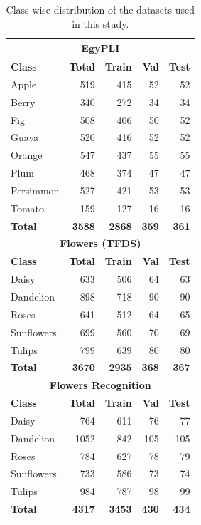 \begin{table}[t]
	\centering
	\caption{Class-wise distribution of the datasets used in this study.}
	\label{tab:classwise_dataset_distribution}
	\begin{tabular}{|l|r|r|r|r|}
		\hline
		\multicolumn{5}{|c|}{\textbf{EgyPLI}} \\
		\hline
		\textbf{Class} & \textbf{Total} & \textbf{Train} & \textbf{Val} & \textbf{Test} \\
		\hline
		Apple      & 519 & 415 & 52 & 52 \\
		Berry      & 340 & 272 & 34 & 34 \\
		Fig        & 508 & 406 & 50 & 52 \\
		Guava      & 520 & 416 & 52 & 52 \\
		Orange     & 547 & 437 & 55 & 55 \\
		Plum       & 468 & 374 & 47 & 47 \\
		Persimmon  & 527 & 421 & 53 & 53 \\
		Tomato     & 159 & 127 & 16 & 16 \\
		\hline
		\textbf{Total} & \textbf{3588} & \textbf{2868} & \textbf{359} & \textbf{361} \\
		\hline
		
		\multicolumn{5}{|c|}{\textbf{Flowers (TFDS)}} \\
		\hline
		\textbf{Class} & \textbf{Total} & \textbf{Train} & \textbf{Val} & \textbf{Test} \\
		\hline
		Daisy       & 633 & 506 & 64 & 63 \\
		Dandelion   & 898 & 718 & 90 & 90 \\
		Roses       & 641 & 512 & 64 & 65 \\
		Sunflowers  & 699 & 560 & 70 & 69 \\
		Tulips      & 799 & 639 & 80 & 80 \\
		\hline
		\textbf{Total} & \textbf{3670} & \textbf{2935} & \textbf{368} & \textbf{367} \\
		\hline
		
		\multicolumn{5}{|c|}{\textbf{Flowers Recognition}} \\
		\hline
		\textbf{Class} & \textbf{Total} & \textbf{Train} & \textbf{Val} & \textbf{Test} \\
		\hline
		Daisy       & 764  & 611 & 76 & 77 \\
		Dandelion   & 1052 & 842 & 105 & 105 \\
		Roses       & 784  & 627 & 78 & 79 \\
		Sunflowers  & 733  & 586 & 73 & 74 \\
		Tulips      & 984  & 787 & 98 & 99 \\
		\hline
		\textbf{Total} & \textbf{4317} & \textbf{3453} & \textbf{430} & \textbf{434} \\
		\hline
	\end{tabular}
\end{table}